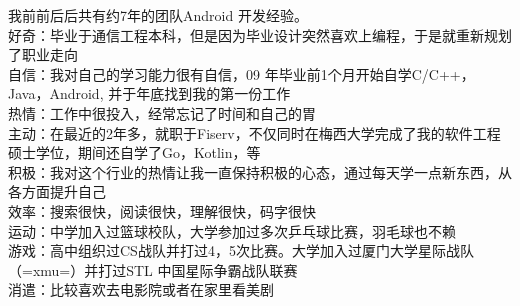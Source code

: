 
\begin{cvparagraph}
我前前后后共有约7年的团队Android 开发经验。\\
好奇：毕业于通信工程本科，但是因为毕业设计突然喜欢上编程，于是就重新规划了职业走向\\
自信：我对自己的学习能力很有自信，09 年毕业前1个月开始自学C/C++，Java，Android, 并于年底找到我的第一份工作\\
热情：工作中很投入，经常忘记了时间和自己的胃\\
主动：在最近的2年多，就职于Fiserv，不仅同时在梅西大学完成了我的软件工程硕士学位，期间还自学了Go，Kotlin，等\\
积极：我对这个行业的热情让我一直保持积极的心态，通过每天学一点新东西，从各方面提升自己\\
效率：搜索很快，阅读很快，理解很快，码字很快\\
运动：中学加入过篮球校队，大学参加过多次乒乓球比赛，羽毛球也不赖\\
游戏：高中组织过CS战队并打过4，5次比赛。大学加入过厦门大学星际战队（=xmu=）并打过STL 中国星际争霸战队联赛\\
消遣：比较喜欢去电影院或者在家里看美剧
\end{cvparagraph}



